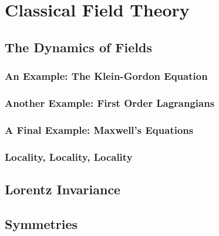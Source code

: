 \chapter{Classical Field Theory} %
\label{cha:Classical Field Theory}

\section{The Dynamics of Fields} %
\label{sec:The Dynamics of Fields}

\subsection{An Example: The Klein-Gordon Equation} %
\label{sub:An Example: The Klein-Gordon Equation}

\subsection{Another Example: First Order Lagrangians} %
\label{sub:Another Example: First Order Lagrangians}

\subsection{A Final Example: Maxwell's Equations} %
\label{sub:A Final Example: Maxwell's Equations}

\subsection{Locality, Locality, Locality} %
\label{sub:Locality, Locality, Locality}


\section{Lorentz Invariance} %
\label{sec:Lorentz Invariance}


\section{Symmetries} %
\label{sec:Symmetries}

